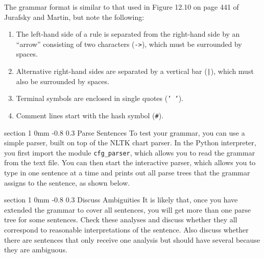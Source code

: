 \documentclass[10.9pt]{article}
\makeatletter
\newcommand{\newsec}[2]{\section{#1}\label{sec:#2}\noindent}
\renewcommand{\section}{\@startsection
{section}%
{1}%
{0mm}%
{-0.8\baselineskip}%
{0.3\baselineskip}%
{\bfseries\large}}%
\makeatother
\begin{document}
\begin{center}
\fbox{

}
\end{center}
The grammar format is similar to that used in Figure 12.10 on page 441 of Jurafsky and Martin, but note the following:
\begin{enumerate}[noitemsep]
\item The left-hand side of a rule is separated from the right-hand side by an ``arrow'' consisting of two characters ({\tt ->}), which must be surrounded by spaces.
\item Alternative right-hand sides are separated by a vertical bar ({\tt |}), which must also be surrounded by spaces.
\item Terminal symbols are enclosed in single quotes ({\tt ' '}).
\item Comment lines start with the hash symbol ({\tt \#}).
\end{enumerate}

\newsec{Parse Sentences}{parse}%
To test your grammar, you can use a simple parser, built on top of the NLTK chart parser. In the Python interpreter, you first import the module {\tt cfg\_parser}, which allows you 
to read the grammar from the text file. You can then start the interactive parser, which allows you to type in one sentence at a time and prints out all parse trees that the grammar assigns to the sentence, as shown below.
\begin{center}
\fbox{

}
\end{center}

\newsec{Discuss Ambiguities}{parse}%
It is likely that, once you have extended the grammar to cover all sentences, you will get more than one parse tree for some sentences. Check these analyses and discuss whether they all correspond to reasonable interpretations of the sentence. Also discuss whether there are sentences that only receive one analysis but should have several because they are ambiguous.
\end{document}
